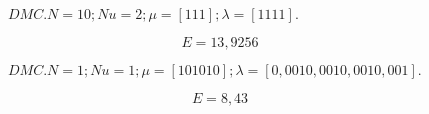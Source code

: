 \begin{figure}[H]
    \centering
    
    \caption{$DMC. N = 10; Nu = 2; \mu = [1 1 1]; \lambda = [1 1 1 1].$}
\end{figure}

\begin{equation}
    E = 13,9256
\end{equation}
    


\begin{figure}[H]
    \centering
    
    \caption{$DMC. N = 1; Nu = 1; \mu = [10 10 10]; \lambda = [0,001 0,001 0,001 0,001].$}
\end{figure}

\begin{equation}
    E = 8,43
\end{equation}


%     


%     


%     



